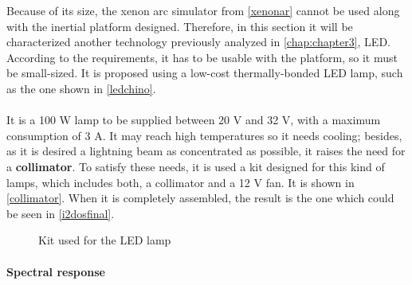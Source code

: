 Because of its size, the xenon arc simulator from \ref{xenonar} cannot be used along with the inertial platform designed. Therefore, in this section it will be characterized another technology previously analyzed in \autoref{chap:chapter3}, \acrshort{LED}. According to the requirements, it has to be usable with the platform, so it must be small-sized. It is proposed using a low-cost thermally-bonded \acrshort{LED} lamp, such as the one shown in \autoref{ledchino}. \\ \\


\vspace{-1cm}
It is a 100 W lamp to be supplied between 20 V and 32 V, with a maximum consumption of 3 A. It may reach high temperatures so it needs cooling; besides, as it is desired a lightning beam as concentrated as possible, it raises the need for a \textbf{collimator}. To satisfy these needs, it is used a kit designed for this kind of lamps, which includes both, a collimator and a 12 V fan. It is shown in \autoref{collimator}. When it is completely assembled, the result is the one which could be seen in \autoref{i2dosfinal}.



			\begin{figure}[H]
			\centering
			\quad
			 \quad
			\caption{Kit used for the \acrshort{LED} lamp} \label{collimator}
			\vspace{-1cm}
\end{figure}


\paragraph{Spectral response}

